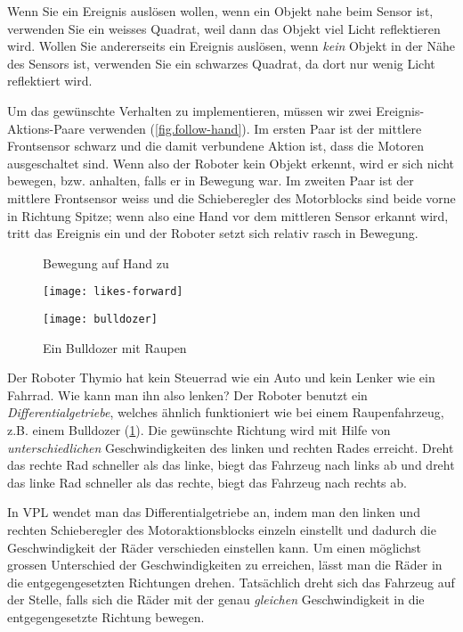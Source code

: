 Wenn Sie ein Ereignis auslösen wollen, wenn ein Objekt nahe beim Sensor ist, verwenden Sie ein weisses Quadrat, weil dann das Objekt viel Licht reflektieren wird. Wollen Sie andererseits ein Ereignis auslösen, wenn \emph{kein} Objekt in der Nähe des Sensors ist, verwenden Sie ein
schwarzes Quadrat, da dort nur wenig Licht reflektiert wird.

Um das gewünschte Verhalten zu implementieren, müssen wir zwei Ereignis-Aktions-Paare verwenden (\cref{fig.follow-hand}). Im ersten Paar ist der mittlere Frontsensor schwarz und die damit verbundene Aktion ist, dass die Motoren ausgeschaltet sind. Wenn also der Roboter kein Objekt erkennt, wird er sich nicht bewegen, bzw. anhalten, falls er in Bewegung war. Im zweiten Paar ist der mittlere Frontsensor weiss und die Schieberegler des Motorblocks sind beide vorne in Richtung Spitze; wenn also eine Hand vor dem mittleren Sensor erkannt wird, tritt das Ereignis ein und der Roboter setzt sich relativ rasch in Bewegung. 

\begin{figure}
\begin{floatrow}
	\ffigbox
	{\caption{Bewegung auf Hand zu}\label{fig.follow-hand}}
	{\texttt{[image: likes-forward]}}
	\ffigbox
	{\caption{Ein Bulldozer mit Raupen}\label{fig.bull}}
	{\texttt{[image: bulldozer]}}
\end{floatrow}
\end{figure}


Der Roboter Thymio hat kein Steuerrad wie ein Auto und kein Lenker wie ein Fahrrad. Wie kann man ihn also lenken? Der Roboter benutzt ein \emph{Differentialgetriebe}, welches ähnlich funktioniert wie bei einem Raupenfahrzeug, z.B. einem Bulldozer (\cref{fig.bull}).
Die gewünschte Richtung wird mit Hilfe von \emph{unterschiedlichen} Geschwindigkeiten des linken und rechten Rades erreicht. Dreht das rechte Rad schneller als das linke, biegt das Fahrzeug nach links ab und dreht das linke Rad schneller als das rechte, biegt das Fahrzeug nach rechts ab.

In VPL wendet man das Differentialgetriebe an, indem man den linken und rechten Schieberegler des Motoraktionsblocks einzeln einstellt und dadurch die Geschwindigkeit der Räder verschieden einstellen kann.
Um einen möglichst grossen Unterschied der Geschwindigkeiten zu erreichen, lässt man die Räder in die entgegengesetzten Richtungen drehen. Tatsächlich dreht sich das Fahrzeug auf der Stelle, falls sich die Räder mit der genau \emph{gleichen} Geschwindigkeit in die entgegengesetzte Richtung bewegen.

